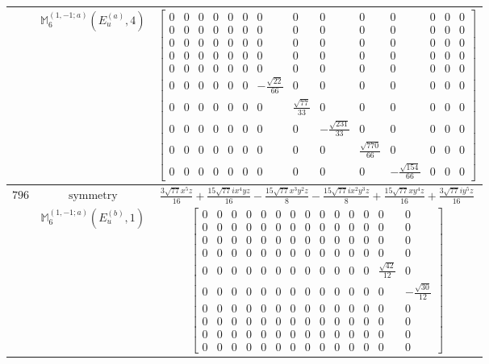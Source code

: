 \documentclass[fleqn,8pt,landscape]{jsarticle}
\begin{document}
\begin{longtable}{ccc}
$  $ & $ \mathbb{M}_{6}^{(1,-1;a)}(E_{u}^{(a)},4) $ & $ \begin{bmatrix} 0 & 0 & 0 & 0 & 0 & 0 & 0 & 0 & 0 & 0 & 0 & 0 & 0 & 0 \\ 0 & 0 & 0 & 0 & 0 & 0 & 0 & 0 & 0 & 0 & 0 & 0 & 0 & 0 \\ 0 & 0 & 0 & 0 & 0 & 0 & 0 & 0 & 0 & 0 & 0 & 0 & 0 & 0 \\ 0 & 0 & 0 & 0 & 0 & 0 & 0 & 0 & 0 & 0 & 0 & 0 & 0 & 0 \\ 0 & 0 & 0 & 0 & 0 & 0 & 0 & 0 & 0 & 0 & 0 & 0 & 0 & 0 \\ 0 & 0 & 0 & 0 & 0 & 0 & - \frac{\sqrt{22}}{66} & 0 & 0 & 0 & 0 & 0 & 0 & 0 \\ 0 & 0 & 0 & 0 & 0 & 0 & 0 & \frac{\sqrt{77}}{33} & 0 & 0 & 0 & 0 & 0 & 0 \\ 0 & 0 & 0 & 0 & 0 & 0 & 0 & 0 & - \frac{\sqrt{231}}{33} & 0 & 0 & 0 & 0 & 0 \\ 0 & 0 & 0 & 0 & 0 & 0 & 0 & 0 & 0 & \frac{\sqrt{770}}{66} & 0 & 0 & 0 & 0 \\ 0 & 0 & 0 & 0 & 0 & 0 & 0 & 0 & 0 & 0 & - \frac{\sqrt{154}}{66} & 0 & 0 & 0 \end{bmatrix} $ \\ \hline
$ 796 $ & $ \text{symmetry} $ & $ \frac{3 \sqrt{77} x^{5} z}{16} + \frac{15 \sqrt{77} i x^{4} y z}{16} - \frac{15 \sqrt{77} x^{3} y^{2} z}{8} - \frac{15 \sqrt{77} i x^{2} y^{3} z}{8} + \frac{15 \sqrt{77} x y^{4} z}{16} + \frac{3 \sqrt{77} i y^{5} z}{16} $ \\
$  $ & $ \mathbb{M}_{6}^{(1,-1;a)}(E_{u}^{(b)},1) $ & $ \begin{bmatrix} 0 & 0 & 0 & 0 & 0 & 0 & 0 & 0 & 0 & 0 & 0 & 0 & 0 & 0 \\ 0 & 0 & 0 & 0 & 0 & 0 & 0 & 0 & 0 & 0 & 0 & 0 & 0 & 0 \\ 0 & 0 & 0 & 0 & 0 & 0 & 0 & 0 & 0 & 0 & 0 & 0 & 0 & 0 \\ 0 & 0 & 0 & 0 & 0 & 0 & 0 & 0 & 0 & 0 & 0 & 0 & 0 & 0 \\ 0 & 0 & 0 & 0 & 0 & 0 & 0 & 0 & 0 & 0 & 0 & 0 & \frac{\sqrt{42}}{12} & 0 \\ 0 & 0 & 0 & 0 & 0 & 0 & 0 & 0 & 0 & 0 & 0 & 0 & 0 & - \frac{\sqrt{30}}{12} \\ 0 & 0 & 0 & 0 & 0 & 0 & 0 & 0 & 0 & 0 & 0 & 0 & 0 & 0 \\ 0 & 0 & 0 & 0 & 0 & 0 & 0 & 0 & 0 & 0 & 0 & 0 & 0 & 0 \\ 0 & 0 & 0 & 0 & 0 & 0 & 0 & 0 & 0 & 0 & 0 & 0 & 0 & 0 \\ 0 & 0 & 0 & 0 & 0 & 0 & 0 & 0 & 0 & 0 & 0 & 0 & 0 & 0 \end{bmatrix} $ \\ \hline

\end{longtable}
\end{document}

